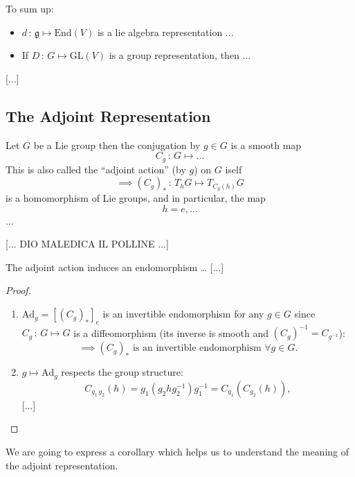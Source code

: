 To sum up:
\begin{itemize}
    \item \(d \,:\, \mathfrak{g} \mapsto \mathrm{End}(V) \) is a lie algebra representation ...
    \item If \(D \,:\, G \mapsto \mathrm{GL}(V) \) is a group representation, then ...
\end{itemize}

[...]

\subsection{The Adjoint Representation}

\begin{definition}
    Let \(G\) be a Lie group then the conjugation by \(g \in G\) is a smooth map
    \[
        C_g \,:\, G \mapsto \dots
    \]
    This is also called the ``adjoint action'' (by \(g\)) on \(G\) iself
    \[
        \implies (C_g)_* \,:\, T_h G \mapsto T_{C_g(h)} G
    \]
    is a homomorphism of Lie groups, and in particular, the map
    \[
        h = e, \dots
    \]
    ...
\end{definition}


[... DIO MALEDICA IL POLLINE ...]

\begin{proposition}
    The adjoint action induces an endomorphism \dots
    [...]
\end{proposition}

\begin{proof}
    \begin{enumerate}
        \item \(\mathrm{Ad}_g = [(C_g)_*]_e \) is an invertible endomorphism for any \(g \in G\) since \(C_g \,:\, G \mapsto G \) is a diffeomorphism (its inverse is smooth and \((C_{g})^{-1} = C_{g^{-1}}\)):
              \[
                  \implies (C_g)_* \text{ is an invertible endomorphism } \forall g \in G.
              \]

        \item \(g \mapsto \mathrm{Ad}_g\) respects the group structure:
              \[
                  C_{g_1 \, g_2}(h) = g_1 (g_2 h g_2^{-1})g_1^{-1} = C_{g_1} (C_{g_2}(h)),
              \]
              [...]
    \end{enumerate}
\end{proof}

We are going to express a corollary which helps us to understand the meaning of the adjoint representation.

